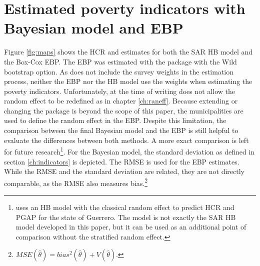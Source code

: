 \section{Estimated poverty indicators with Bayesian model and EBP}
Figure \ref{fig:maps} shows the HCR and estimates for both the SAR HB model and the Box-Cox EBP.
The EBP was estimated with the  package \citep{kreutzmann_r_2019} with the Wild bootstrap option.
As  does not include the survey weights in the estimation process, neither the EBP nor the HB model use the weights when estimating the poverty indicators.
Unfortunately, at the time of writing  does not allow the random effect to be redefined as in chapter \ref{ch:raneff}.
Because extending or changing the  package is beyond the scope of this paper, the municipalities are used to define the random effect in the EBP.
Despite this limitation, the comparison between the final Bayesian model and the EBP is still helpful to evaluate the differences between both methods.
A more exact comparison is left for future research\footnote{\cite{morelli_hierarchical_2021} uses an HB model with the classical random effect to predict HCR and PGAP for the state of Guerrero. The model is not exactly the SAR HB model developed in this paper, but it can be used as an additional point of comparison without the stratified random effect.}.
For the Bayesian model, the standard deviation as defined in section \ref{ch:indicators} is depicted.
The RMSE is used for the EBP estimates.
While the RMSE and the standard deviation are related, they are not directly comparable, as the RMSE also measures bias.\footnote{$MSE(\hat \theta) = bias^2(\hat \theta) + V(\hat \theta).$}


